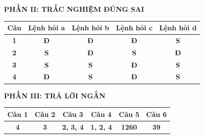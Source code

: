 \documentclass[11pt,a4paper]{article}
\begin{document}
\vspace{0.3cm}
\noindent\textbf{\color{mainGreen}PHẦN II: TRẮC NGHIỆM ĐÚNG SAI}
\begin{center}
\renewcommand{\arraystretch}{1.2}
\begin{tabular}{|c|c|c|c|c|}
\hline
\textbf{Câu} & \textbf{Lệnh hỏi a} & \textbf{Lệnh hỏi b} & \textbf{Lệnh hỏi c} & \textbf{Lệnh hỏi d} \\ \hline
\textbf{1} & \textbf{\color{red}Đ} & \textbf{\color{red}Đ} & \textbf{\color{red}Đ} & \textbf{S} \\ \hline
\textbf{2} & \textbf{S} & \textbf{\color{red}Đ} & \textbf{S} & \textbf{\color{red}Đ} \\ \hline
\textbf{3} & \textbf{S} & \textbf{S} & \textbf{\color{red}Đ} & \textbf{S} \\ \hline
\textbf{4} & \textbf{\color{red}Đ} & \textbf{S} & \textbf{\color{red}Đ} & \textbf{S} \\ \hline
\end{tabular}
\end{center}

\vspace{0.3cm}
\noindent\textbf{\color{mainGreen}PHẦN III: TRẢ LỜI NGẮN}
\begin{center}
\renewcommand{\arraystretch}{1.2}
\begin{tabular}{|c|c|c|c|c|c|}
\hline
\textbf{Câu 1} & \textbf{Câu 2} & \textbf{Câu 3} & \textbf{Câu 4} & \textbf{Câu 5} & \textbf{Câu 6} \\ \hline
\textbf{\color{red}4} & \textbf{\color{red}3} & \textbf{\color{red}2, 3, 4} & \textbf{\color{red}1, 2, 4} & \textbf{\color{red}1260} & \textbf{\color{red}39} \\ \hline
\end{tabular}
\end{center}
\end{document}
